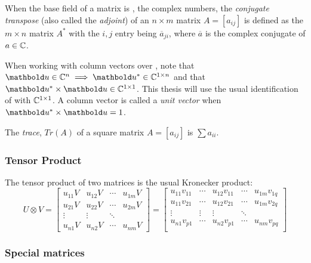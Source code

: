 When the base field of a matrix is \complex, the complex numbers,
the \emph{conjugate transpose} (also called the \emph{adjoint})
of  an $n\times m$ matrix $A=[a_{ij}]$ is defined
as the $m\times n$ matrix
$A^{*}$ with
the $i,j$ entry being $\overline{a}_{ji}$,
where  $\overline{a}$ is the complex conjugate of $a\in\mathbb{C}$.

When working with column vectors over \complex, note that
$\vc{u} \in \complex^n \implies \vc{u}^{*} \in
\complex^{1\times n}$ and that
 $\vc{u}^{*}\times \vc{u} \in \complex^{1\times 1}$.
This thesis will use the usual identification of
\complex{} with $\mathbb{C}^{1\times1}$. A column
vector  is called a \emph{unit vector}
when $\vc{u}^{*}\times \vc{u} = 1$.

\begin{definition}[Trace]
The \emph{trace}, $Tr(A)$ of a square matrix $A=[a_{ij}]$ is $\sum a_{ii}$.
\end{definition}

\subsubsection{Tensor Product} %
\label{ssub:tensor_product}


The tensor product of two matrices is the usual Kronecker product:
\[U\otimes V =
\begin{bmatrix}
u_{11}V&u_{12}V & \cdots &u_{1m}V\\
u_{21}V&u_{22}V & \cdots &u_{2m}V \\
\vdots&\vdots&\ddots\\
u_{n1}V&u_{n2}V & \cdots &u_{nm}V
\end{bmatrix}
=
\begin{bmatrix}
u_{11}v_{11}&\cdots&u_{12}v_{11} & \cdots& u_{1m}v_{1q} \\
u_{11}v_{21}&\cdots&u_{12}v_{21} & \cdots& u_{1m}v_{2q} \\
\vdots&\vdots&\vdots&\ddots \\
u_{n1}v_{p1}&\cdots&u_{n2}v_{p1} & \cdots& u_{nm}v_{pq} \\
\end{bmatrix}
\]

\subsubsection{Special matrices} %
\label{ssub:special_matrices}

